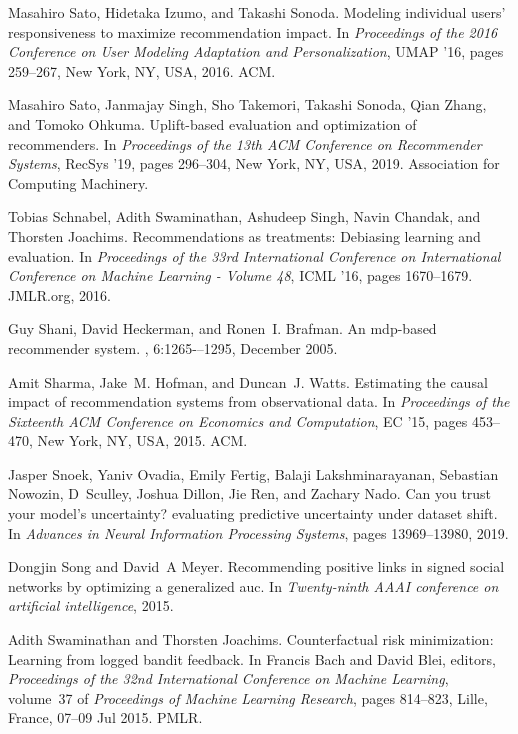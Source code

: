 \documentclass[manuscript,screen]{acmart}
\begin{document}
\begin{thebibliography}{10}
	Masahiro Sato, Hidetaka Izumo, and Takashi Sonoda.
	\newblock Modeling individual users' responsiveness to maximize recommendation
	impact.
	\newblock In {\em Proceedings of the 2016 Conference on User Modeling
		Adaptation and Personalization}, UMAP '16, pages 259--267, New York, NY, USA,
	2016. ACM.
	
	Masahiro Sato, Janmajay Singh, Sho Takemori, Takashi Sonoda, Qian Zhang, and
	Tomoko Ohkuma.
	\newblock Uplift-based evaluation and optimization of recommenders.
	\newblock In {\em Proceedings of the 13th ACM Conference on Recommender
		Systems}, RecSys '19, pages 296--304, New York, NY, USA, 2019. Association
	for Computing Machinery.
	
	Tobias Schnabel, Adith Swaminathan, Ashudeep Singh, Navin Chandak, and Thorsten
	Joachims.
	\newblock Recommendations as treatments: Debiasing learning and evaluation.
	\newblock In {\em Proceedings of the 33rd International Conference on
		International Conference on Machine Learning - Volume 48}, ICML '16, pages
	1670--1679. JMLR.org, 2016.
	
	Guy Shani, David Heckerman, and Ronen~I. Brafman.
	\newblock An mdp-based recommender system.
	, 6:1265-–1295, December 2005.
	
	Amit Sharma, Jake~M. Hofman, and Duncan~J. Watts.
	\newblock Estimating the causal impact of recommendation systems from
	observational data.
	\newblock In {\em Proceedings of the Sixteenth ACM Conference on Economics and
		Computation}, EC '15, pages 453--470, New York, NY, USA, 2015. ACM.
	
	Jasper Snoek, Yaniv Ovadia, Emily Fertig, Balaji Lakshminarayanan, Sebastian
	Nowozin, D~Sculley, Joshua Dillon, Jie Ren, and Zachary Nado.
	\newblock Can you trust your model's uncertainty? evaluating predictive
	uncertainty under dataset shift.
	\newblock In {\em Advances in Neural Information Processing Systems}, pages
	13969--13980, 2019.
	
	Dongjin Song and David~A Meyer.
	\newblock Recommending positive links in signed social networks by optimizing a
	generalized auc.
	\newblock In {\em Twenty-ninth AAAI conference on artificial intelligence},
	2015.
	
	Adith Swaminathan and Thorsten Joachims.
	\newblock Counterfactual risk minimization: Learning from logged bandit
	feedback.
	\newblock In Francis Bach and David Blei, editors, {\em Proceedings of the 32nd
		International Conference on Machine Learning}, volume~37 of {\em Proceedings
		of Machine Learning Research}, pages 814--823, Lille, France, 07--09 Jul
	2015. PMLR.
	

\end{thebibliography}
\end{document}
